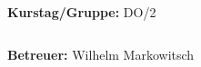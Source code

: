 \documentclass[12pt,a4paper]{article}
\begin{document}
\begin{verbatim}


\end{verbatim}
			\begin{flushleft}
			\textbf{\Large{Kurstag/Gruppe:}} \Large{DO/2}
			\end{flushleft}

\begin{verbatim}

\end{verbatim}
			\begin{flushleft}
			\LARGE{\textbf{Betreuer:}}	\Large{Wilhelm Markowitsch}	
			\end{flushleft}

\pagebreak
\setlength{\columnsep}{20pt}
\end{document}
